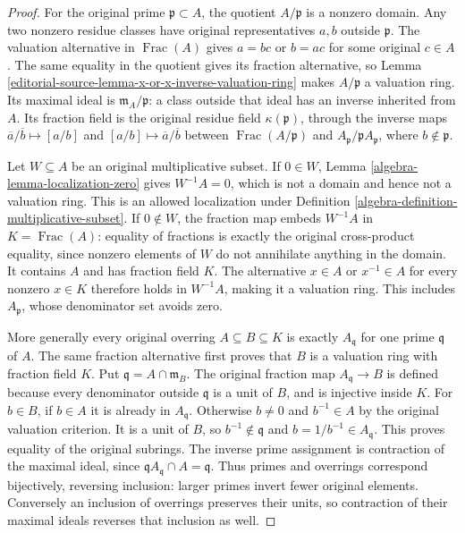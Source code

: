 \begin{proof}
For the original prime
$\mathfrak p\subset A$, the
quotient $A/\mathfrak p$ is
a nonzero domain. Any two
nonzero residue classes have
original representatives $a,b$
outside $\mathfrak p$.
The valuation alternative in
$\operatorname{Frac}(A)$ gives
$a=bc$ or $b=ac$ for
some original $c\in A$.
The same equality in the
quotient gives its fraction
alternative, so Lemma
\ref{editorial-source-lemma-x-or-x-inverse-valuation-ring}
makes $A/\mathfrak p$ a
valuation ring. Its maximal
ideal is $\mathfrak m_A/\mathfrak p$:
a class outside that ideal
has an inverse inherited
from $A$. Its fraction field
is the original residue
field $\kappa(\mathfrak p)$,
through the inverse maps
$\overline a/\overline b\mapsto[a/b]$
and $[a/b]\mapsto\overline a/\overline b$
between $\operatorname{Frac}(A/\mathfrak p)$
and $A_{\mathfrak p}/\mathfrak pA_{\mathfrak p}$,
where $b\notin\mathfrak p$.

Let $W\subseteq A$ be an
original multiplicative subset.
If $0\in W$, Lemma
\ref{algebra-lemma-localization-zero}
gives $W^{-1}A=0$, which
is not a domain and hence
not a valuation ring.
This is an allowed localization
under Definition
\ref{algebra-definition-multiplicative-subset}.
If $0\notin W$, the
fraction map embeds $W^{-1}A$
in $K=\operatorname{Frac}(A)$:
equality of fractions is
exactly the original cross-product
equality, since nonzero elements
of $W$ do not annihilate
anything in the domain.
It contains $A$ and has
fraction field $K$. The
alternative $x\in A$ or
$x^{-1}\in A$ for every
nonzero $x\in K$ therefore
holds in $W^{-1}A$, making
it a valuation ring. This
includes $A_{\mathfrak p}$,
whose denominator set avoids zero.

More generally every original
overring $A\subseteq B\subseteq K$
is exactly $A_{\mathfrak q}$
for one prime $\mathfrak q$
of $A$. The same fraction
alternative first proves that
$B$ is a valuation ring
with fraction field $K$.
Put $\mathfrak q=A\cap\mathfrak m_B$.
The original fraction map
$A_{\mathfrak q}\to B$ is
defined because every denominator
outside $\mathfrak q$ is
a unit of $B$, and is
injective inside $K$.
For $b\in B$, if $b\in A$
it is already in $A_{\mathfrak q}$.
Otherwise $b\neq0$ and
$b^{-1}\in A$ by the
original valuation criterion.
It is a unit of $B$,
so $b^{-1}\notin\mathfrak q$
and $b=1/b^{-1}\in A_{\mathfrak q}$.
This proves equality of the
original subrings. The inverse
prime assignment is contraction
of the maximal ideal, since
$\mathfrak qA_{\mathfrak q}\cap A=\mathfrak q$.
Thus primes and overrings
correspond bijectively, reversing
inclusion: larger primes invert
fewer original elements.
Conversely an inclusion of overrings
preserves their units, so contraction
of their maximal ideals reverses
that inclusion as well.


\end{proof}
